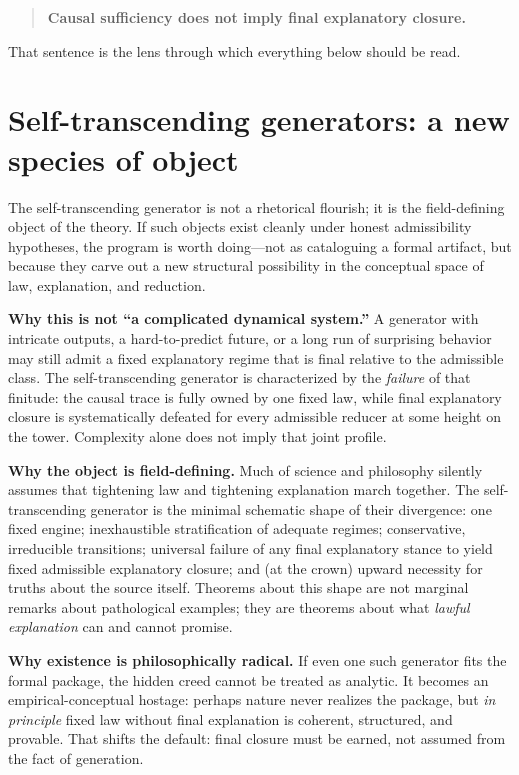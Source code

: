 \documentclass[11pt,a4paper]{article}
\theoremstyle{definition}
\begin{document}
\begin{quote}
\textbf{Causal sufficiency does not imply final explanatory closure.}
\end{quote}

That sentence is the lens through which everything below should be read.

\section{Self-transcending generators: a new species of object}\label{sec:self-transcending}

The self-transcending generator is not a rhetorical flourish; it is the field-defining object of the theory. If such objects exist cleanly under honest admissibility hypotheses, the program is worth doing---not as cataloguing a formal artifact, but because they carve out a new structural possibility in the conceptual space of law, explanation, and reduction.

\medskip
\noindent
\textbf{Why this is not ``a complicated dynamical system.''}
A generator with intricate outputs, a hard-to-predict future, or a long run of surprising behavior may still admit a fixed explanatory regime that is final relative to the admissible class. The self-transcending generator is characterized by the \emph{failure} of that finitude: the causal trace is fully owned by one fixed law, while final explanatory closure is systematically defeated for every admissible reducer at some height on the tower. Complexity alone does not imply that joint profile.

\medskip
\noindent
\textbf{Why the object is field-defining.}
Much of science and philosophy silently assumes that tightening law and tightening explanation march together. The self-transcending generator is the minimal schematic shape of their divergence: one fixed engine; inexhaustible stratification of adequate regimes; conservative, irreducible transitions; universal failure of any final explanatory stance to yield fixed admissible explanatory closure; and (at the crown) upward necessity for truths about the source itself. Theorems about this shape are not marginal remarks about pathological examples; they are theorems about what \emph{lawful explanation} can and cannot promise.

\medskip
\noindent
\textbf{Why existence is philosophically radical.}
If even one such generator fits the formal package, the hidden creed cannot be treated as analytic. It becomes an empirical-conceptual hostage: perhaps nature never realizes the package, but \emph{in principle} fixed law without final explanation is coherent, structured, and provable. That shifts the default: final closure must be earned, not assumed from the fact of generation.
\end{document}
